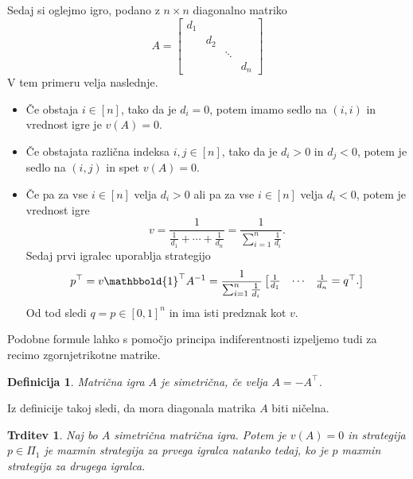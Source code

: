 \documentclass[10pt, a4paper]{article}
\newtheorem{trditev}[izr]{Trditev}
\newtheorem{defi}[izr]{Definicija}
\newenvironment{noticeB}{%
  \tcolorbox[%
  notitle,
  empty,
  enhanced,  %
  breakable,
  coltext=black,
  colback=white, 
  fontupper=\rmfamily,
  parbox=false,
  noparskip,
  sharp corners,
  boxrule=-1pt,  %
  frame hidden,
  left=7pt,  %
  right=7pt,
  top=5pt,
  bottom=5pt,
  before skip=2.5ex plus 2pt,
  after skip=2.5ex plus 2pt,
  borderline west = {1.5pt}{-0.1pt}{blue!30!black}, %
  overlay unbroken and last={%
    \draw[color=black, line width=1.25pt]
    ($(frame.south west)+(1.pt, -0.1pt)$) -- ++(2em, 0);
  }
  ]}
{\endtcolorbox}
\newenvironment{definicija}{\begin{defi}\begin{noticeB}}{%
    \end{noticeB}\end{defi}}
\begin{document}
Sedaj si oglejmo igro, podano z $n \times n$ diagonalno matriko 
$$A = \begin{bmatrix}
  d_1 &&& \\
   & d_2 && \\
   && \ddots &\\
   &&& d_n
\end{bmatrix}$$
V tem primeru velja naslednje.
\begin{itemize}
  \item Če obstaja $i \in [n]$, tako da je $d_i = 0$, potem imamo sedlo na $(i, i)$ in vrednost igre je $v(A) = 0$.
  \item Če obstajata različna indeksa $i, j \in [n]$, tako da je $d_i > 0$ in $d_j < 0$, potem je sedlo na $(i, j)$ in spet $v(A) = 0$.
  \item Če pa za vse $i \in [n]$ velja $d_i > 0$ ali pa za vse $i \in [n]$ velja $d_i < 0$, 
  potem je vrednost igre 
  $$v = \frac{1}{\frac{1}{d_1} + \cdots + \frac{1}{d_n}} = \frac{1}{\sum_{i = 1} ^n \frac{1}{d_i}}.$$
  Sedaj prvi igralec uporablja strategijo 
  $$p^\top=  v \mathbbold{1}^\top A^{-1} = \frac{1}{\sum_{i = 1} ^n \frac{1}{d_i}} \begin{bmatrix}
    \frac{1}{d_1} & \cdots & \frac{1}{d_n} = q^\top.
  \end{bmatrix}$$
  Od tod sledi $q = p \in [0, 1]^n$ in ima isti predznak kot $v$.
\end{itemize}
Podobne formule lahko s pomočjo principa indiferentnosti izpeljemo tudi za recimo zgornjetrikotne matrike.

\begin{definicija}
  Matrična igra $A$ je simetrična, če velja $A = -A^\top$.
\end{definicija}

Iz definicije takoj sledi, da mora diagonala matrika $A$ biti ničelna.

\begin{trditev}
  Naj bo $A$ simetrična matrična igra. Potem je $v(A) = 0$ in strategija 
  $p \in \Pi_1$ je maxmin strategija za prvega igralca natanko tedaj, ko je $p$
  maxmin strategija za drugega igralca.
\end{trditev}
\end{document}
